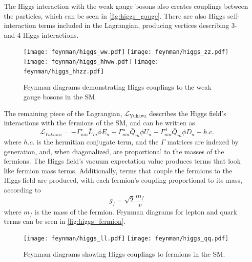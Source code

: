 The Higgs interaction with the weak gauge bosons also creates couplings between the particles, which can be seen in \autoref{fig:higgs_gauge}. There are also Higgs self-interaction terms included in the Lagrangian, producing vertices describing 3- and 4-Higgs interactions. 

\begin{centering}
\begin{figure}[!hbt]
\myfloatalign
\texttt{[image: feynman/higgs\_ww.pdf]}
\texttt{[image: feynman/higgs\_zz.pdf]}
\texttt{[image: feynman/higgs\_hhww.pdf]}
\texttt{[image: feynman/higgs\_hhzz.pdf]}
\caption{Feynman diagrams demonstrating Higgs couplings to the weak gauge bosons in the \ac{SM}.}
\label{fig:higgs_gauge}
\end{figure}
\end{centering}

The remaining piece of the Lagrangian, $\mathcal{L}_\text{Yukawa}$ describes the Higgs field's interactions with the fermions of the \ac{SM}, and can be written as
%
\begin{equation}
\mathcal{L}_{Yukawa} = -\Gamma^e_{mn}\bar{L}_m \phi E_n -\Gamma^u_{mn}\bar{Q}_m \phi U_n -\Gamma^d_{mn}\bar{Q}_m \phi D_n + h.c.
\end{equation} 
%
where $h.c.$ is the hermitian conjugate term, and the $\Gamma$ matrices are indexed by generation, and, when diagonalized, are proportional to the masses of the fermions. The Higgs field's vacuum expectation value produces terms that look like fermion mass terms. Additionally, terms that couple the fermions to the Higgs field are produced, with each fermion's coupling proportional to its mass, according to 
%
\begin{equation}
g_{f} = \sqrt{2}\frac{m_f}{v}
\end{equation}
%
where $m_f$ is the mass of the fermion. Feynman diagrams for lepton and quark terms can be seen in \autoref{fig:higgs_fermion}.

\begin{centering}
\begin{figure}[!hbt]
\myfloatalign
\texttt{[image: feynman/higgs\_ll.pdf]}
\texttt{[image: feynman/higgs\_qq.pdf]}
\caption{Feynman diagrams showing Higgs couplings to fermions in the \ac{SM}.}
\label{fig:higgs_fermion}
\end{figure}
\end{centering}


